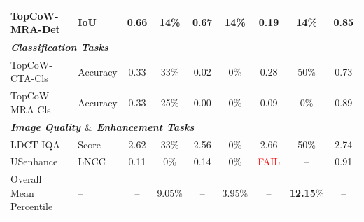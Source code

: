 \documentclass{midl} %
\begin{document}
\begin{table}[t]
\begin{tabular}{l l 
                c c 
                c c 
                c c 
                c}
TopCoW-MRA-Det & IoU & 0.66 & 14\% & 0.67 & 14\% & 0.19 & 14\% & 0.85 \\
\midrule
\multicolumn{9}{l}{\textit{\textbf{Classification Tasks}}} \\
TopCoW-CTA-Cls & Accuracy & 0.33 & 33\% & 0.02 & 0\% & 0.28 & 50\% & 0.73 \\
TopCoW-MRA-Cls & Accuracy & 0.33 & 25\% & 0.00 & 0\% & 0.09 & 0\% & 0.89 \\
\midrule
\multicolumn{9}{l}{\textit{\textbf{Image Quality $\&$ Enhancement Tasks}}} \\
LDCT-IQA & Score & 2.62 & 33\% & 2.56 & 0\% & 2.66 & 50\% & 2.74 \\
USenhance & LNCC & 0.11 & 0\% & 0.14 & 0\% & \textcolor{red}{FAIL} & -- & 0.91 \\
\midrule
Overall Mean Percentile & -- & -- & 9.05\% & -- & 3.95\% & -- & \textbf{12.15}\% & -- \\
\bottomrule
\end{tabular}
\end{table}
\end{document}
